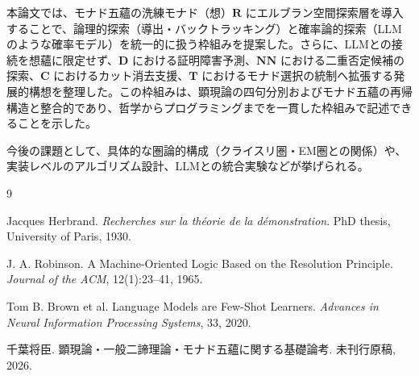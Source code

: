 \documentclass[11pt,a4paper]{ltjsarticle}
\theoremstyle{definition}
\newcommand{\Md}{\mathbf{D}}
\newcommand{\Mnn}{\mathbf{NN}}
\newcommand{\Mr}{\mathbf{R}}
\newcommand{\MC}{\mathbf{C}}
\newcommand{\MT}{\mathbf{T}}
\begin{document}
本論文では、モナド五蘊の洗練モナド（想）$\Mr$ にエルブラン空間探索層を導入することで、論理的探索（導出・バックトラッキング）と確率論的探索（LLMのような確率モデル）を統一的に扱う枠組みを提案した。さらに、LLMとの接続を想蘊に限定せず、$\Md$ における証明障害予測、$\Mnn$ における二重否定候補の探索、$\MC$ におけるカット消去支援、$\MT$ におけるモナド選択の統制へ拡張する発展的構想を整理した。この枠組みは、顕現論の四句分別およびモナド五蘊の再帰構造と整合的であり、哲学からプログラミングまでを一貫した枠組みで記述できることを示した。

今後の課題として、具体的な圏論的構成（クライスリ圏・EM圏との関係）や、実装レベルのアルゴリズム設計、LLMとの統合実験などが挙げられる。

\begin{thebibliography}{9}

Jacques Herbrand.
\newblock \emph{Recherches sur la th\'eorie de la d\'emonstration}.
\newblock PhD thesis, University of Paris, 1930.

J. A. Robinson.
\newblock A Machine-Oriented Logic Based on the Resolution Principle.
\newblock \emph{Journal of the ACM}, 12(1):23--41, 1965.

Tom B. Brown et al.
\newblock Language Models are Few-Shot Learners.
\newblock \emph{Advances in Neural Information Processing Systems}, 33, 2020.

千葉将臣.
\newblock 顕現論・一般二諦理論・モナド五蘊に関する基礎論考.
\newblock 未刊行原稿, 2026.

\end{thebibliography}
\end{document}
